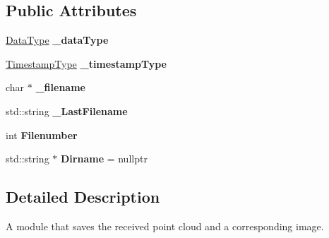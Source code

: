 \subsection*{Public Attributes}
\begin{DoxyCompactItemize}
\item 
\hypertarget{classFilesaveModule_a460a7df3d81b88f62f3f7f08d63873cd}{\hyperlink{classFilesaveModule_a268eda9476b90bc83b551c50eb7c67fe}{Data\-Type} {\bfseries \-\_\-data\-Type}}\label{classFilesaveModule_a460a7df3d81b88f62f3f7f08d63873cd}

\item 
\hypertarget{classFilesaveModule_aa2a6744d6ef434f67c8b40ae37fa0211}{\hyperlink{classFilesaveModule_a5c70900e45fc43e441b55ba02fd3ae21}{Timestamp\-Type} {\bfseries \-\_\-timestamp\-Type}}\label{classFilesaveModule_aa2a6744d6ef434f67c8b40ae37fa0211}

\item 
\hypertarget{classFilesaveModule_a1eb8c3415e82e328ab70e76f0d9bd321}{char $\ast$ {\bfseries \-\_\-filename}}\label{classFilesaveModule_a1eb8c3415e82e328ab70e76f0d9bd321}

\item 
\hypertarget{classFilesaveModule_a3bd9f1266fe56307ea0ec12290b0929a}{std\-::string {\bfseries \-\_\-\-Last\-Filename}}\label{classFilesaveModule_a3bd9f1266fe56307ea0ec12290b0929a}

\item 
\hypertarget{classFilesaveModule_adc0f187162eb4e92559b9f96f7f71ce7}{int {\bfseries Filenumber}}\label{classFilesaveModule_adc0f187162eb4e92559b9f96f7f71ce7}

\item 
\hypertarget{classFilesaveModule_a5bc2e7a1cf23e1e22339fc832b87d441}{std\-::string $\ast$ {\bfseries Dirname} = nullptr}\label{classFilesaveModule_a5bc2e7a1cf23e1e22339fc832b87d441}

\end{DoxyCompactItemize}


\subsection{Detailed Description}
A module that saves the received point cloud and a corresponding image. 


